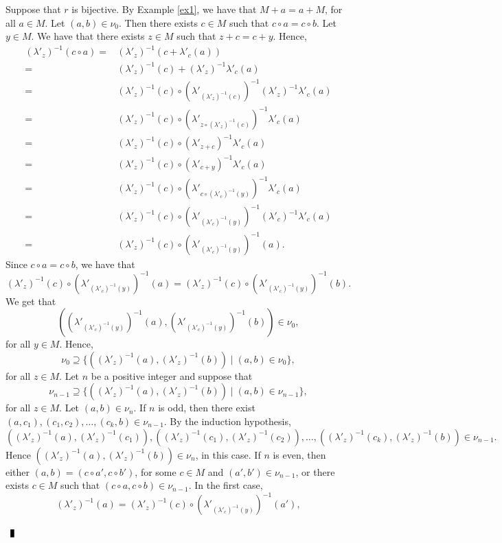 \documentclass[10pt]{article}
\newenvironment{proof}{\par\noindent{\bf Proof.}}{$\qed$\par\bigskip}
\newcommand{\qed}{\enspace\vrule  height6pt  width4pt  depth2pt}
\begin{document}
\begin{proof}
	Suppose that $r$ is bijective. By Example \ref{ex1}, we have that $M+a=a+M$, for all $a\in M$. 
	Let $(a,b)\in \nu_0$. Then there exists $c\in M$ such that
	$c\circ a=c\circ b$. Let $y\in M$. We have that there exists $z\in M$ such that $z+c=c+y$. Hence,
	\begin{align*}(\lambda'_z)^{-1}(c\circ a)=&(\lambda'_z)^{-1}(c+\lambda'_c(a))\\
		=&(\lambda'_z)^{-1}(c)+(\lambda'_z)^{-1}\lambda'_c(a)\\
		=&(\lambda'_z)^{-1}(c)\circ (\lambda'_{(\lambda'_z)^{-1}(c)})^{-1}(\lambda'_z)^{-1}\lambda'_c(a)\\
		=&(\lambda'_z)^{-1}(c)\circ (\lambda'_{z\circ (\lambda'_z)^{-1}(c)})^{-1}\lambda'_c(a)\\
		=&(\lambda'_z)^{-1}(c)\circ (\lambda'_{z+c})^{-1}\lambda'_c(a)\\
		=&(\lambda'_z)^{-1}(c)\circ (\lambda'_{c+y})^{-1}\lambda'_c(a)\\
		=&(\lambda'_z)^{-1}(c)\circ (\lambda'_{c\circ(\lambda'_c)^{-1}(y)})^{-1}\lambda'_c(a)\\
		=&(\lambda'_z)^{-1}(c)\circ (\lambda'_{(\lambda'_c)^{-1}(y)})^{-1}(\lambda'_c)^{-1}\lambda'_c(a)\\
		=&(\lambda'_z)^{-1}(c)\circ (\lambda'_{(\lambda'_c)^{-1}(y)})^{-1}(a).
	\end{align*}
	Since $c\circ a=c\circ b$, we have that
	$$(\lambda'_z)^{-1}(c)\circ (\lambda'_{(\lambda'_c)^{-1}(y)})^{-1}(a)=(\lambda'_z)^{-1}(c)\circ (\lambda'_{(\lambda'_c)^{-1}(y)})^{-1}(b).
	$$
We get that	
		$$((\lambda'_{(\lambda'_c)^{-1}(y)})^{-1}(a),(\lambda'_{(\lambda'_c)^{-1}(y)})^{-1}(b))\in \nu_0,
		$$
		for all $y\in M$. Hence,
		$$\nu_0\supseteq \{ ( (\lambda'_z)^{-1}(a),(\lambda'_z)^{-1}(b))\mid (a,b)\in\nu_0\},$$
		for	all $z\in M$.
Let $n$ be a positive integer and suppose that 	
	$$\nu_{n-1}\supseteq \{ ( (\lambda'_z)^{-1}(a),(\lambda'_z)^{-1}(b))\mid (a,b)\in\nu_{n-1}\},$$
for	all $z\in M$. Let $(a,b)\in \nu_n$. If $n$ is odd, then there exist $(a,c_1),(c_1,c_2),\dots, (c_k,b)\in\nu_{n-1}$. By the induction hypothesis,
$$( (\lambda'_z)^{-1}(a),(\lambda'_z)^{-1}(c_1)),( (\lambda'_z)^{-1}(c_1),(\lambda'_z)^{-1}(c_2)),\dots ,( (\lambda'_z)^{-1}(c_k),(\lambda'_z)^{-1}(b))\in \nu_{n-1}.$$
Hence $( (\lambda'_z)^{-1}(a),(\lambda'_z)^{-1}(b))\in \nu_n$, in this case. If $n$ is even, then either $(a,b)=(c\circ a',c\circ b')$, for some $c\in M$ and $(a',b')\in \nu_{n-1}$, or there exists $c\in M$ such that 
$(c\circ a,c\circ b)\in\nu_{n-1}$. In the first case,
$$(\lambda'_z)^{-1}(a)=(\lambda'_z)^{-1}(c)\circ (\lambda'_{(\lambda'_c)^{-1}(y)})^{-1}(a'),$$

\end{proof}
\end{document}
